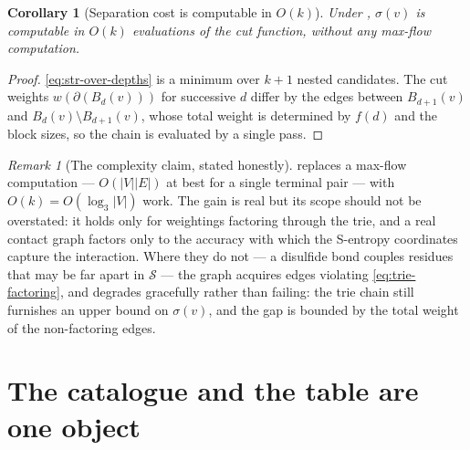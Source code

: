 \documentclass[11pt,twocolumn,a4paper]{article}
\theoremstyle{thmstyle}
\newtheorem{corollary}[theorem]{Corollary}
\theoremstyle{definition}
\theoremstyle{remark}
\newtheorem{remark}[theorem]{Remark}
\newcommand{\V}{V}
\newcommand{\E}{E}
\newcommand{\wt}{w}
\newcommand{\cut}{\partial}
\newcommand{\str}{\sigma}
\newcommand{\Sspace}{\mathcal{S}}
\newcommand{\abs}[1]{\lvert#1\rvert}
\begin{document}
\begin{corollary}[Separation cost is computable in $O(k)$]
\label{cor:sepcost-cheap}
Under , $\str(v)$ is computable in $O(k)$
evaluations of the cut function, without any max-flow computation.
\end{corollary}

\begin{proof}
\eqref{eq:str-over-depths} is a minimum over $k+1$ nested candidates.
The cut weights $\wt(\cut(B_d(v)))$ for successive $d$ differ by the
edges between $B_{d+1}(v)$ and $B_d(v) \setminus B_{d+1}(v)$, whose
total weight is determined by $f(d)$ and the block sizes, so the chain
is evaluated by a single pass.
\end{proof}

\begin{remark}[The complexity claim, stated honestly]
\label{rem:complexity-honest}
 replaces a max-flow computation --- $O(\abs{\V}
\abs{\E})$ at best for a single terminal pair --- with $O(k) =
O(\log_3 \abs{\V})$ work. The gain is real but its scope should not be
overstated: it holds only for weightings factoring through the trie,
and a real contact graph factors only to the accuracy with which the
S-entropy coordinates capture the interaction. Where they do not ---
a disulfide bond couples residues that may be far apart in
$\Sspace$ --- the graph acquires edges violating
\eqref{eq:trie-factoring}, and  degrades
gracefully rather than failing: the trie chain still furnishes an upper
bound on $\str(v)$, and the gap is bounded by the total weight of the
non-factoring edges.
\end{remark}

\section{The catalogue and the table are one object}
\label{sec:identity-thm}
\end{document}
